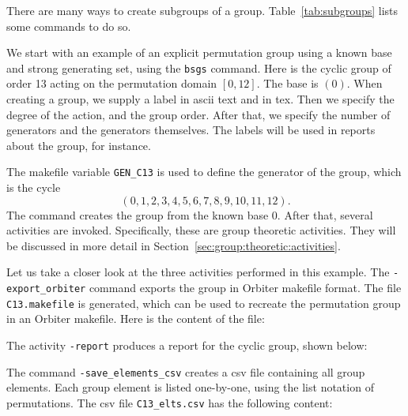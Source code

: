 
There are many ways to create subgroups of a group.
Table~\ref{tab:subgroups} lists some commands to do so.






\bigskip



We start with an example of an explicit permutation 
group using a known base and strong generating set, 
using the \verb'bsgs' command.
Here is the cyclic group of order 13 acting on the permutation domain $[0,12]$. 
The base is $(0)$. When creating a group, we supply a label in ascii text and in tex. 
Then we specify the degree of the action, and the group order. 
After that, we specify the number of generators and the generators themselves.
The labels will be used in reports about the group, for instance. 




The makefile variable \verb'GEN_C13' is used to define the generator of the group, which is 
the cycle 
$$
(0,1,2,3,4,5,6,7,8,9,10,11,12).
$$
The command creates the group from the known base $0$. 
After that, several activities are invoked.
Specifically, these are group theoretic activities. 
They will be discussed in more detail in Section~\ref{sec:group:theoretic:activities}.

\bigskip

Let us take a closer look at the three activities performed in this example.
The \verb'-export_orbiter' command 
exports the group in Orbiter makefile format.
The file \verb'C13.makefile' is generated,
which can be used to recreate the permutation group in an Orbiter makefile. 
Here is the content of the file:



\bigskip

The activity \verb'-report'
produces a report for the cyclic group, shown below:


\bigskip


The command  \verb'-save_elements_csv'
creates a csv file containing all group elements. 
Each group element is listed one-by-one, using the list notation of permutations.
The csv file \verb'C13_elts.csv' has the following content:



